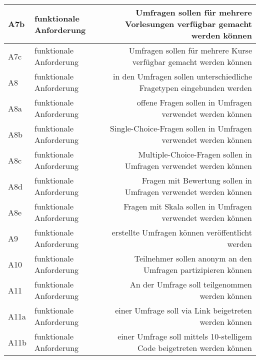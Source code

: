 \begin{tabularx}{\textwidth}{|l|k|r|}
      \hline
      {\label{Anf:A7b}A7b} & funktionale Anforderung & Umfragen sollen für mehrere Vorlesungen verfügbar gemacht werden können \\
      \hline
      {\label{Anf:A7c}A7c} & funktionale Anforderung & Umfragen sollen für mehrere Kurse verfügbar gemacht werden können \\
      \hline
      {\label{Anf:A8}A8} & funktionale Anforderung & in den Umfragen sollen unterschiedliche Fragetypen eingebunden werden \\
      \hline
      {\label{Anf:A8a}A8a} & funktionale Anforderung & offene Fragen sollen in Umfragen verwendet werden können \\
      \hline
      {\label{Anf:A8b}A8b} & funktionale Anforderung & Single-Choice-Fragen sollen in Umfragen verwendet werden können \\
      \hline
      {\label{Anf:A8c}A8c} & funktionale Anforderung & Multiple-Choice-Fragen sollen in Umfragen verwendet werden können \\
      \hline
      {\label{Anf:A8d}A8d} & funktionale Anforderung & Fragen mit Bewertung sollen in Umfragen verwendet werden können \\
      \hline
      {\label{Anf:A8e}A8e} & funktionale Anforderung & Fragen mit Skala sollen in Umfragen verwendet werden können \\
      \hline
      {\label{Anf:A9}A9} & funktionale Anforderung & erstellte Umfragen können veröffentlicht werden \\
      \hline
      {\label{Anf:A10}A10} & funktionale Anforderung & Teilnehmer sollen anonym an den Umfragen partizipieren können \\
      \hline
      {\label{Anf:A11}A11} & funktionale Anforderung & An der Umfrage soll teilgenommen werden können \\
      \hline
      {\label{Anf:A11a}A11a} & funktionale Anforderung & einer Umfrage soll via Link beigetreten werden können \\
      \hline
      {\label{Anf:A11b}A11b} & funktionale Anforderung & einer Umfrage soll mittels 10-stelligem Code beigetreten werden können \\
      \bottomrule
  \end{tabularx}
